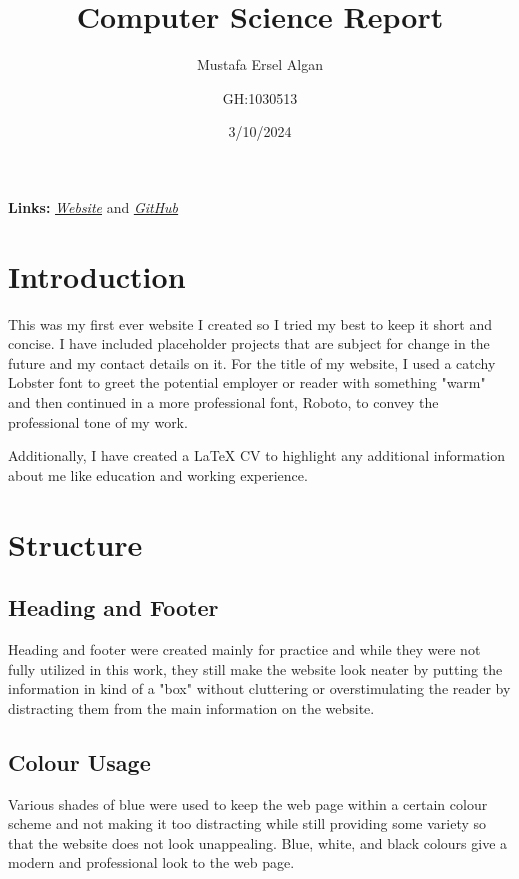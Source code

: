 \documentclass[twoside]{article}
\title{Computer Science Report}
\author{Mustafa Ersel Algan \and GH:1030513}
\date{3/10/2024}
\begin{document}
\maketitle{}

\noindent \textbf{Links:} 
\href{https://qwersel.github.io/ersel.github.io/Ersel%20Algan%20CS%20Project/Ersel%20Algan%20HTML%20Portfolio/Computer%20Science%20Portfolio.html}{\underline{\textit{Website}}} 
\textnormal{ and } 
\href{https://github.com/Qwersel/ersel.github.io/tree/4c633d38ef109d9e028325fb7ee654e1b4a1144e/Ersel%20Algan%20CS%20Project}{\underline{\textit{GitHub}}}

\section*{Introduction}
This was my first ever website I created so I tried my best to keep it short and concise. I have included placeholder projects that are subject for change in the future and my contact details on it. For the title of my website, I used a catchy Lobster font to greet the potential employer or reader with something "warm" and then continued in a more professional font, Roboto, to convey the professional tone of my work.

\vspace{1em}

\noindent Additionally, I have created a LaTeX CV to highlight any additional information about me like education and working experience.

\section*{Structure}
\subsection*{Heading and Footer}
Heading and footer were created mainly for practice and while they were not fully utilized in this work, they still make the website look neater by putting the information in kind of a "box" without cluttering or overstimulating the reader by distracting them from the main information on the website.

\subsection*{Colour Usage}
Various shades of blue were used to keep the web page within a certain colour scheme and not making it too distracting while still providing some variety so that the website does not look unappealing. Blue, white, and black colours give a modern and professional look to the web page.
\end{document}
